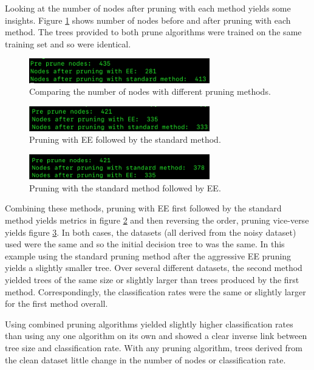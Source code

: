 \documentclass{article}
\begin{document}
Looking at the number of nodes after pruning with each method yields some insights. Figure \ref{pruning:s1} shows number of nodes before and after pruning with each method. The trees provided to both prune algorithms were trained on the same training set and so were identical.


\begin{figure}
\centering
\includegraphics[width=0.7\textwidth]{figures/prunings1.png}
\caption{\label{pruning:s1} Comparing the number of nodes with different pruning methods. }
\end{figure}

\begin{figure}
\centering
\includegraphics[width=0.7\textwidth]{figures/prunings2.png}
\caption{\label{pruning:s2} Pruning with EE followed by the standard method. }
\end{figure}

\begin{figure}
\centering
\includegraphics[width=0.7\textwidth]{figures/prunings3.png}
\caption{\label{pruning:s3} Pruning with the standard method followed by EE. }
\end{figure}



Combining these methods, pruning with EE first followed by the standard method yields metrics in figure \ref{pruning:s2} and then reversing the order, pruning vice-verse yields figure \ref{pruning:s3}. In both cases, the datasets (all derived from the noisy dataset) used were the same and so the initial decision tree to was the same. In this example using the standard pruning method after the aggressive EE pruning yields a slightly smaller tree. Over several different datasets, the second method yielded trees of the same size or slightly larger than trees produced by the first method. Correspondingly, the classification rates were the same or slightly larger for the first method overall.

Using combined pruning algorithms yielded slightly higher classification rates than using any one algorithm on its own and showed a clear inverse link between tree size and classification rate. With any pruning algorithm, trees derived from the clean dataset little change in the number of nodes or classification rate.
\end{document}
